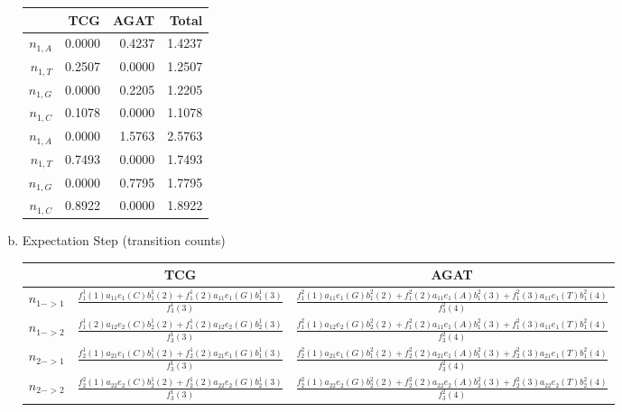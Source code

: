 \documentclass[11pt]{extarticle} %
\begin{document}
\begin{enumerate}[(a)]
\begin{table}[H]
\centering
\begin{tabular}{r|r|r|r}
  \hline
 & TCG & AGAT & Total \\ 
  \hline
  $n_{1,A}$ & 0.0000 & 0.4237 & 1.4237 \\ 
  $n_{1,T}$ & 0.2507 & 0.0000 & 1.2507 \\ 
  $n_{1,G}$ & 0.0000 & 0.2205 & 1.2205 \\ 
  $n_{1,C}$ & 0.1078 & 0.0000 & 1.1078 \\ 
  $n_{1,A}$ & 0.0000 & 1.5763 & 2.5763 \\ 
  $n_{1,T}$ & 0.7493 & 0.0000 & 1.7493 \\ 
  $n_{1,G}$ & 0.0000 & 0.7795 & 1.7795 \\ 
  $n_{1,C}$ & 0.8922 & 0.0000 & 1.8922 \\ 
   \hline
\end{tabular}
\end{table}
\item Expectation Step (transition counts)
\begin{table}[H]
\centering
\begin{tabular}{r|c|c}
  \hline
 & TCG & AGAT \\ 
  \hline
$n_{1 -> 1}$ & $\frac{f_1^1(1)a_{11}e_1(C)b_1^1(2) + f_1^1(2)a_{11}e_1(G)b_1^1(3)}{f_3^1(3)}$ & 
$\frac{f_1^2(1)a_{11}e_1(G)b_1^2(2) + f_1^2(2)a_{11}e_1(A)b_1^2(3) + f_1^2(3)a_{11}e_1(T)b_1^2(4)}{f_3^2(4)}$ \\
$n_{1 -> 2}$ & $\frac{f_1^1(2)a_{12}e_2(C)b_2^1(2) + f_1^1(2)a_{12}e_2(G)b_2^1(3)}{f_3^1(3)}$ & 
$\frac{f_1^2(1)a_{12}e_2(G)b_2^2(2) + f_1^2(2)a_{11}e_1(A)b_1^2(3) + f_1^2(3)a_{11}e_1(T)b_1^2(4)}{f_3^2(4)}$ \\
  \hline
  \hline
$n_{2 -> 1}$ & $\frac{f_2^1(1)a_{21}e_1(C)b_1^1(2) + f_2^1(2)a_{21}e_1(G)b_1^1(3)}{f_3^1(3)}$ & 
$\frac{f_2^2(1)a_{21}e_1(G)b_1^2(2) + f_2^2(2)a_{21}e_1(A)b_1^2(3) + f_2^2(3)a_{21}e_1(T)b_1^2(4)}{f_3^2(4)}$ \\
$n_{2 -> 2}$ & $\frac{f_2^2(1)a_{22}e_2(C)b_2^1(2) + f_2^1(2)a_{22}e_2(G)b_2^1(3)}{f_3^1(3)}$ & 
$\frac{f_2^2(1)a_{22}e_2(G)b_2^2(2) + f_2^2(2)a_{22}e_2(A)b_2^2(3) + f_2^2(3)a_{22}e_2(T)b_2^2(4)}{f_3^2(4)}$ \\
  \hline

\end{tabular}
\end{table}


\end{enumerate}
\end{document}
